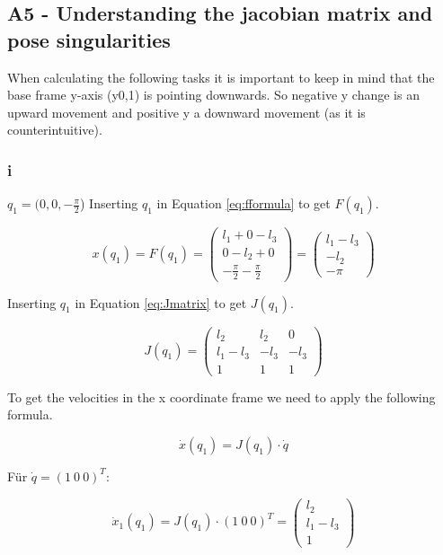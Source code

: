 \subsection{A5 - Understanding the jacobian matrix and pose singularities}

When calculating the following tasks it is important to keep in mind that the base frame y-axis (y0,1) is pointing downwards. So negative y change is an upward movement and positive y a downward movement (as it is counterintuitive).

\subsubsection{i}
\textbf{$q_1=(0, 0 , -\frac{\pi}{2}$})
\newline 
Inserting $q_1$ in Equation \ref{eq:fformula} to get $F(q_1)$.

\begin{equation}
    x(q_1) = F(q_1) = \begin{pmatrix} 
   l_1 + 0 - l_3\\
   0 - l_2 + 0\\
  -\frac{\pi}{2} -\frac{\pi}{2}  \end{pmatrix} = \begin{pmatrix} 
   l_1 - l_3\\
 -l_2 \\
  -\pi  \end{pmatrix}
\end{equation}


Inserting $q_1$ in Equation \ref{eq:Jmatrix} to get $J(q_1)$.

\begin{equation}
    J(q_1) = \begin{pmatrix} 
  l_2&l_2&0\\
  l_1-l_3& -l_3& -l_3\\
  1  & 1 & 1\end{pmatrix}
\end{equation}

To get the velocities in the x coordinate frame we need to apply the following formula.

\begin{equation}
    \dot{x}(q_1)=J(q_1)\cdot \dot{q}
\end{equation}

Für $\dot{q}=(1\ 0\ 0)^T$:

\begin{equation}
    \dot{x}_1(q_1)=J(q_1)\cdot (1\ 0\ 0)^T = \begin{pmatrix} 
  l_2\\
  l_1-l_3\\
  1\end{pmatrix}
\end{equation}

